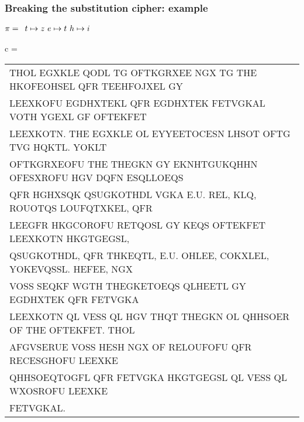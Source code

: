 \documentclass[aspectratio=169, lualatex, handout, 10pt,dvipsnames,svgnames]{beamer} %
\def\enbleu#1{\textcolor{bleu}{#1}}
\def\enrouge#1{\textcolor{rouge}{#1}}
\begin{document}
\begin{frame}
  \frametitle{Breaking the substitution cipher: example}

  
    \enrouge{
    \tiny{$\pi=
      \begin{array}[t]{l}
      t\mapsto z\ e\mapsto t\ h\mapsto i\ 
      \end{array}
      $}}
  \vspace{0.25cm}

  \color{vert}
  \tiny{c =
    \begin{tabular}[t]{l}
      \enbleu{T}\enbleu{H}OL EGXKL\enbleu{E} QODL \enbleu{T}G OF\enbleu{T}KGRXE\enbleu{E} NGX \enbleu{T}G \enbleu{T}\enbleu{H}\enbleu{E} HKOFEOHS\enbleu{E}L QFR \enbleu{T}\enbleu{E}E\enbleu{H}FOJX\enbleu{E}L GY \\
      L\enbleu{E}EXKOFU EGDHX\enbleu{T}\enbleu{E}KL QFR EGDHX\enbleu{T}\enbleu{E}K F\enbleu{E}\enbleu{T}VGKAL VO\enbleu{T}\enbleu{H} YGEXL GF OF\enbleu{T}\enbleu{E}KF\enbleu{E}\enbleu{T} \\
      L\enbleu{E}EXKO\enbleu{T}N. \enbleu{T}\enbleu{H}\enbleu{E} EGXKL\enbleu{E} OL \enbleu{E}YY\enbleu{E}E\enbleu{T}OC\enbleu{E}SN LHSO\enbleu{T} OF\enbleu{T}G \enbleu{T}VG HQK\enbleu{T}L. YOKL\enbleu{T} \\
      OF\enbleu{T}KGRXEOFU \enbleu{T}\enbleu{H}\enbleu{E} \enbleu{T}\enbleu{H}\enbleu{E}GKN GY EKNH\enbleu{T}GUKQH\enbleu{H}N OFESXROFU \enbleu{H}GV DQFN ESQLLOEQS \\
      QFR HGHXSQK QSUGKO\enbleu{T}\enbleu{H}DL VGKA \enbleu{E}.U. R\enbleu{E}L, KLQ, ROUO\enbleu{T}QS LOUFQ\enbleu{T}XK\enbleu{E}L, QFR \\
      L\enbleu{E}EGFR HKGCOROFU R\enbleu{E}\enbleu{T}QOSL GY K\enbleu{E}QS OF\enbleu{T}\enbleu{E}KF\enbleu{E}\enbleu{T} L\enbleu{E}EXKO\enbleu{T}N HKG\enbleu{T}GEGSL, \\
      QSUGKO\enbleu{T}\enbleu{H}DL, QFR \enbleu{T}\enbleu{H}K\enbleu{E}Q\enbleu{T}L, \enbleu{E}.U. OHL\enbleu{E}E, COKXL\enbleu{E}L, YOK\enbleu{E}VQSSL. \enbleu{H}\enbleu{E}FE\enbleu{E}, NGX \\
      VOSS S\enbleu{E}QKF WG\enbleu{T}\enbleu{H} \enbleu{T}\enbleu{H}\enbleu{E}GK\enbleu{E}\enbleu{T}OEQS QLH\enbleu{E}E\enbleu{T}L GY EGDHX\enbleu{T}\enbleu{E}K QFR F\enbleu{E}\enbleu{T}VGKA \\
      L\enbleu{E}EXKO\enbleu{T}N QL V\enbleu{E}SS QL \enbleu{H}GV \enbleu{T}\enbleu{H}Q\enbleu{T} \enbleu{T}\enbleu{H}\enbleu{E}GKN OL QHHSO\enbleu{E}R OF \enbleu{T}\enbleu{H}\enbleu{E} OF\enbleu{T}\enbleu{E}KF\enbleu{E}\enbleu{T}. \enbleu{T}\enbleu{H}OL \\
      AFGVS\enbleu{E}RU\enbleu{E} VOSS \enbleu{H}\enbleu{E}SH NGX OF R\enbleu{E}LOUFOFU QFR R\enbleu{E}C\enbleu{E}SGHOFU L\enbleu{E}EXK\enbleu{E} \\
      QHHSOEQ\enbleu{T}OGFL QFR F\enbleu{E}\enbleu{T}VGKA HKG\enbleu{T}GEGSL QL V\enbleu{E}SS QL WXOSROFU L\enbleu{E}EXK\enbleu{E} \\
      F\enbleu{E}\enbleu{T}VGKAL.
    \end{tabular}
  }
  \vspace{0.5cm}


\end{frame}
\end{document}
